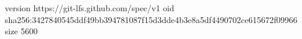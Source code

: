 version https://git-lfs.github.com/spec/v1
oid sha256:3427840545ddf49bb394781087f15d3dde4b3e8a5df4490702ce615672f09966
size 5600
